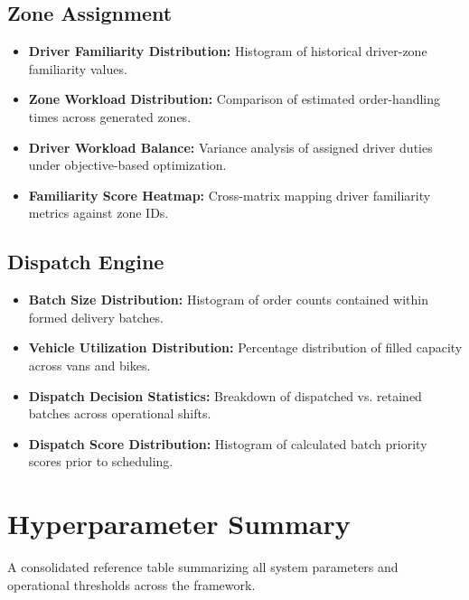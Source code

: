 \documentclass{article}
\begin{document}
\subsection{Zone Assignment}
\begin{itemize}
    \item \textbf{Driver Familiarity Distribution:} Histogram of historical driver-zone familiarity values.
    \item \textbf{Zone Workload Distribution:} Comparison of estimated order-handling times across generated zones.
    \item \textbf{Driver Workload Balance:} Variance analysis of assigned driver duties under objective-based optimization.
    \item \textbf{Familiarity Score Heatmap:} Cross-matrix mapping driver familiarity metrics against zone IDs.
\end{itemize}

\subsection{Dispatch Engine}
\begin{itemize}
    \item \textbf{Batch Size Distribution:} Histogram of order counts contained within formed delivery batches.
    \item \textbf{Vehicle Utilization Distribution:} Percentage distribution of filled capacity across vans and bikes.
    \item \textbf{Dispatch Decision Statistics:} Breakdown of dispatched vs. retained batches across operational shifts.
    \item \textbf{Dispatch Score Distribution:} Histogram of calculated batch priority scores prior to scheduling.
\end{itemize}


\section{Hyperparameter Summary}
\label{app:hyperparameter_summary}

A consolidated reference table summarizing all system parameters and operational thresholds across the framework.
\end{document}
